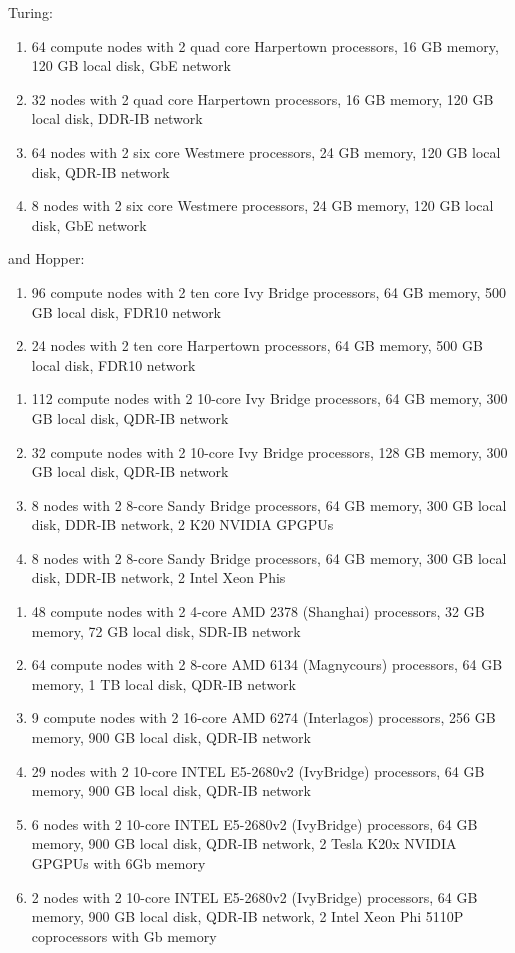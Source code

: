 \ifantwerpen
Turing:
  \begin{enumerate}
    \item  64 compute nodes with 2 quad core Harpertown processors, 16 GB
    memory, 120 GB local disk, GbE network
    \item  32 nodes with 2 quad core Harpertown processors, 16 GB memory,
           120 GB local disk, DDR-IB network
    \item  64 nodes with 2 six core Westmere processors, 24 GB memory,
           120 GB local disk, QDR-IB network
    \item  8 nodes with 2 six core Westmere processors, 24 GB memory,
           120 GB local disk, GbE network
  \end{enumerate}
and Hopper:
  \begin{enumerate}
    \item  96 compute nodes with 2 ten core Ivy Bridge processors, 64 GB memory,
           500 GB local disk, FDR10 network
    \item  24 nodes with 2 ten core Harpertown processors, 64 GB memory,
           500 GB local disk, FDR10 network
  \end{enumerate}
\fi
\ifleuven
  \begin{enumerate}
    \item  112 compute nodes with 2 10-core Ivy Bridge processors, 64 GB memory,
           300 GB local disk, QDR-IB network
    \item  32 compute nodes with 2 10-core Ivy Bridge processors, 128 GB memory,
           300 GB local disk, QDR-IB network
    \item  8 nodes with 2 8-core Sandy Bridge processors, 64 GB memory,
           300 GB local disk, DDR-IB network, 2 K20 NVIDIA GPGPUs
    \item  8 nodes with 2 8-core Sandy Bridge processors, 64 GB memory,
           300 GB local disk, DDR-IB network, 2 Intel Xeon Phis
  \end{enumerate}
\fi
\ifbrussel
  \begin{enumerate}
    \item  48 compute nodes with 2 4-core AMD 2378 (Shanghai) processors, 32 GB
    memory, 72 GB local disk, SDR-IB network
    \item  64 compute nodes with 2 8-core AMD 6134 (Magnycours) processors, 64
    GB memory, 1 TB local disk, QDR-IB network
    \item  9 compute nodes with 2 16-core AMD 6274 (Interlagos) processors, 256
    GB memory, 900 GB local disk, QDR-IB network
    \item  29 nodes with 2 10-core INTEL E5-2680v2 (IvyBridge) processors, 64
    GB memory, 900 GB local disk, QDR-IB network
    \item  6 nodes with 2 10-core INTEL E5-2680v2 (IvyBridge) processors, 64 GB
    memory, 900 GB local disk, QDR-IB network, 2 Tesla K20x NVIDIA GPGPUs with
    6Gb memory
    \item  2 nodes with 2 10-core INTEL E5-2680v2 (IvyBridge) processors, 64 GB
    memory, 900 GB local disk, QDR-IB network, 2 Intel Xeon Phi 5110P
    coprocessors with Gb memory
  \end{enumerate}
